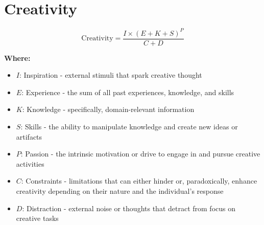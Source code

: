 \chapter{Creativity}

\begin{equation}
\text{Creativity} = \frac{I \times (E + K + S)^P}{C + D}
\end{equation}

\textbf{Where:}

\begin{itemize}
    \item $I$: Inspiration - external stimuli that spark creative thought
    \item $E$: Experience - the sum of all past experiences, knowledge, and skills
    \item $K$: Knowledge - specifically, domain-relevant information
    \item $S$: Skills - the ability to manipulate knowledge and create new ideas or artifacts
    \item $P$: Passion - the intrinsic motivation or drive to engage in and pursue creative activities
    \item $C$: Constraints - limitations that can either hinder or, paradoxically, enhance creativity depending on their nature and the individual's response
    \item $D$: Distraction - external noise or thoughts that detract from focus on creative tasks
\end{itemize}
